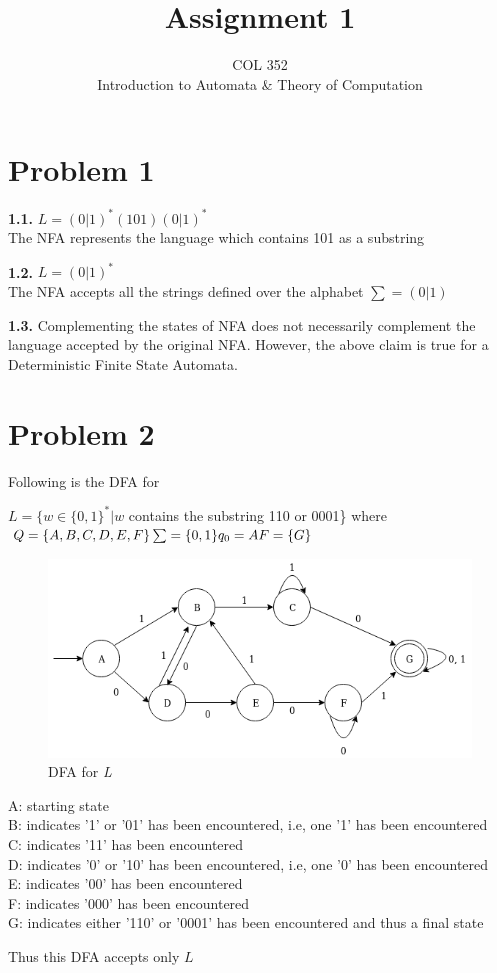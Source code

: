\documentclass{article}
\title{Assignment 1}
\author{COL 352\\
    Introduction to Automata \& 
    Theory of Computation}
\date{}
\begin{document}
\maketitle

\section*{Problem 1}

\textbf{1.1.} 
$L = (0|1)^{*}(101)(0|1)^{*}$\\
The NFA represents the language which contains 101 as a substring 

\textbf{1.2.}
$L = (0|1)^{*}$\\
The NFA accepts all the strings defined over the alphabet $\sum = (0|1)$

\textbf{1.3.}
Complementing the states of NFA does not necessarily complement the language accepted by the original NFA. However, the above claim is true for a Deterministic Finite State Automata. 


\section*{Problem 2}
Following is the DFA for 

$L = \{ w \in  \{0, 1\}^{*} | w$ contains the substring 110 or 0001\} where \\
$Q = \{A, B, C, D, E, F\} \\
\sum = \{0 , 1\} \\
q_{0} = A \\
F = \{ G \}$

\begin{figure}[h]
\centering
\includegraphics[scale=0.5]
{Images/q1.png}
\caption{DFA for \textit{L}}
\end{figure} 


A: starting state \\
B: indicates '1' or '01' has been encountered, i.e, one '1' has been encountered \\
C: indicates '11' has been encountered \\
D: indicates '0' or '10' has been encountered, i.e, one '0' has been encountered \\
E: indicates '00' has been encountered \\
F: indicates '000' has been encountered \\
G: indicates either '110' or '0001' has been encountered and thus a final state

Thus this DFA accepts only $L$
\end{document}
